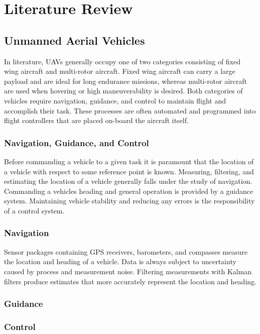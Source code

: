 \documentclass[numbered,pdftex]{ohio-etd}
\begin{document}
\chapter{Literature Review}
\section{Unmanned Aerial Vehicles}

In literature, UAVs generally occupy one of two categories consisting of fixed wing aircraft and multi-rotor aircraft. Fixed wing aircraft can carry a large payload and are ideal for long endurance missions, whereas multi-rotor aircraft are used when hovering or high maneuverability is desired. Both categories of vehicles require navigation, guidance, and control to maintain flight and accomplish their task. These processes are often automated and programmed into flight controllers that are placed on-board the aircraft itself. 


\subsection{Navigation, Guidance, and Control}

Before commanding a vehicle to a given task it is paramount that the location of a vehicle with respect to some reference point is known. Measuring, filtering, and estimating the location of a vehicle generally falls under the study of navigation. Commanding a vehicles heading and general operation is provided by a guidance system. Maintaining vehicle stability and reducing any errors is the responsibility of a control system. 

\subsection{Navigation}
Sensor packages containing GPS receivers, barometers, and compasses measure the location and heading of a vehicle. Data is always subject to uncertainty caused by process and measurement noise. Filtering measurements with Kalman filters produce estimates that more accurately represent the location and heading.

\subsection{Guidance}

\subsection{Control}
\end{document}
